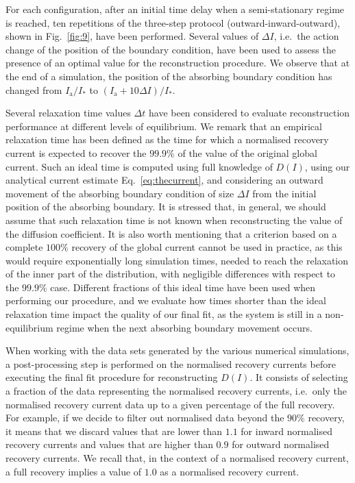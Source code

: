 {For each configuration, after an initial time delay when a semi-stationary regime is reached, ten repetitions of the three-step protocol (outward-inward-outward), shown in Fig.~\ref{fig:9}, have been performed. Several values of $\Delta I$, i.e.\ the action change of the position of the boundary condition, have been used to assess the presence of an optimal value for the reconstruction procedure. We observe that at the end of a simulation, the position of the absorbing boundary condition has changed from $I_\mathrm{a}/I_\ast$ to $(I_\mathrm{a} + 10\Delta I) / I_\ast$. 

Several relaxation time values $\Delta t$ have been considered to evaluate reconstruction performance at different levels of equilibrium. We remark that an empirical relaxation time has been defined as the time for which a normalised recovery current is expected to recover the $99.9\%$ of the value of the original global current. Such an ideal time is computed using full knowledge of $D(I)$, using our analytical current estimate Eq.~\eqref{eq:thecurrent}, and considering an outward movement of the absorbing boundary condition of size $\Delta I$ from the initial position of the absorbing boundary. It is stressed that, in general, we should assume that such relaxation time is not known when reconstructing the value of the diffusion coefficient. It is also worth mentioning that a criterion based on a complete $100\%$ recovery of the global current cannot be used in practice, as this would require exponentially long simulation times, needed to reach the relaxation of the inner part of the distribution, with negligible differences with respect to the $99.9\%$ case. Different fractions of this ideal time have been used when performing our procedure, and we evaluate how times shorter than the ideal relaxation time impact the quality of our final fit, as the system is still in a non-equilibrium regime when the next absorbing boundary movement occurs.

When working with the data sets generated by the various numerical simulations, a post-processing step is performed on the normalised recovery currents before executing the final fit procedure for reconstructing $D(I)$. It consists of selecting a fraction of the data representing the normalised recovery currents, i.e.\ only the normalised recovery current data up to a given percentage of the full recovery. For example, if we decide to filter out normalised data beyond the $90\%$ recovery, it means that we discard values that are lower than $1.1$ for inward normalised recovery currents and values that are higher than $0.9$ for outward normalised recovery currents. We recall that, in the context of a normalised recovery current, a full recovery implies a value of $1.0$ as a normalised recovery current.

}
